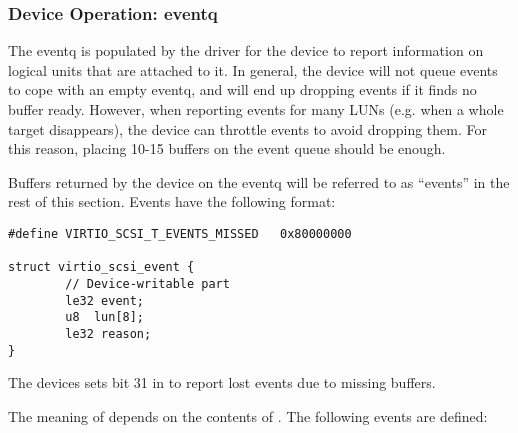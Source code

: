 \subsubsection{Device Operation: eventq}\label{sec:Device Types / SCSI Host Device / Device Operation / Device Operation: eventq}

The eventq is populated by the driver for the device to report information on logical
units that are attached to it. In general, the device will not
queue events to cope with an empty eventq, and will end up
dropping events if it finds no buffer ready. However, when
reporting events for many LUNs (e.g. when a whole target
disappears), the device can throttle events to avoid dropping
them. For this reason, placing 10-15 buffers on the event queue
should be enough.

Buffers returned by the device on the eventq will be referred to
as ``events'' in the rest of this section. Events have the
following format:

\begin{lstlisting}
#define VIRTIO_SCSI_T_EVENTS_MISSED   0x80000000

struct virtio_scsi_event {
        // Device-writable part
        le32 event;
        u8  lun[8];
        le32 reason;
}
\end{lstlisting}

The devices sets bit 31 in  to report lost events
due to missing buffers.

The meaning of  depends on the
contents of . The following events are defined:

